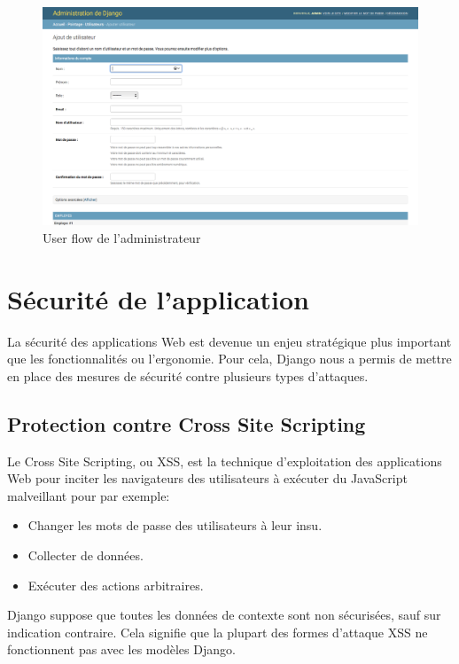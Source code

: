 \begin{figure}[h!]
    \centering
    \includegraphics[scale=0.35]{images/interface/admin_add_employe.png}
    \vspace{-20pt}
    \caption{User flow de l'administrateur}
    \label{fig101}
\end{figure}

\section{Sécurité de l’application}
La sécurité des applications Web est devenue un enjeu stratégique plus
important que les fonctionnalités ou l’ergonomie. Pour cela, Django nous a
permis de mettre en place des mesures de sécurité contre plusieurs types
d’attaques.

\subsection{Protection contre Cross Site Scripting}
Le Cross Site Scripting, ou XSS, est la technique d'exploitation des 
applications Web pour inciter les navigateurs des utilisateurs à exécuter du 
JavaScript malveillant pour par exemple:

\begin{itemize}
    \item[\textbullet] Changer les mots de passe des utilisateurs à leur insu.
    \item[\textbullet] Collecter de données.
    \item[\textbullet] Exécuter des actions arbitraires.
\end{itemize}

Django suppose que toutes les données de contexte sont non sécurisées, sauf sur 
indication contraire. Cela signifie que la plupart des formes d'attaque XSS ne 
fonctionnent pas avec les modèles Django.

